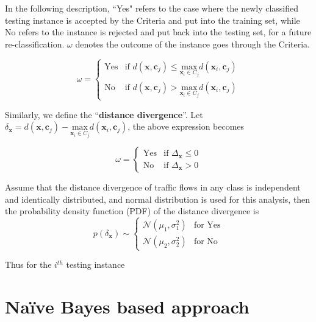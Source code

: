 \documentclass[10pt]{article}
\newcommand{\x}{\textbf{x}}
\newcommand{\cc}{\textbf{c}}
\begin{document}
In the following description, ``Yes" refers to the case where the newly classified testing instance is accepted by the Criteria and put into the training set, while No refers to the instance is rejected and put back into the testing set, for a future re-classification. $\omega$ denotes the outcome of the instance goes through the Criteria.

\[
\omega = \begin{cases} \text{Yes} &\mbox{if  }  d(\x,\cc_j) \leq \underset{\x_i\in C_j}{\text{max}}d(\x_i,\cc_j)\\
\text{No} &\mbox{if }  d(\x,\cc_j) > \underset{\x_i\in C_j}{\text{max}}d(\x_i,\cc_j)\end{cases}
\]

Similarly, we define the ``\textbf{distance divergence}''. Let $\delta_{\x}=d(\x,\cc_j)-\underset{\x_i\in C_j}{\text{max}}d(\x_i,\cc_j)$, the above expression becomes

\[
\omega = \begin{cases} \text{Yes} & \text{if  }  \Delta_{\x}\leq 0\\
\text{No} &\text{if } \Delta_{\x} > 0 \end{cases}
\] 

Assume that the distance divergence of traffic flows in any class is independent and identically distributed, and normal distribution is used for this analysis, then the probability density function (PDF) of the distance divergence is 
\[
p(\delta_{\x})  \sim \begin{cases} \mathcal{N}(\mu_1,\sigma^2_1) &\text{for Yes}\\
\mathcal{N}(\mu_2,\sigma^2_2)  &\text{for No}\end{cases}
\]

Thus for the $i^{th}$ testing instance

\section{Na\"{i}ve Bayes based approach}


\end{document}
